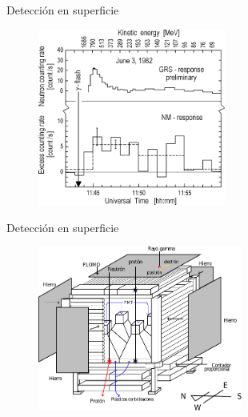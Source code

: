 \documentclass[spanish,aspectratio=169]{beamer}
\begin{document}
\begin{frame}{Detección en superficie}

\begin{figure}
	\centering
	\includegraphics[width=0.55\textwidth]{neutrons-ground.png}
\end{figure}

\end{frame}

\begin{frame}{Detección en superficie}

\begin{figure}
	\centering
	\includegraphics[width=0.6\textwidth]{tns-mexico.pdf}
\end{figure}

\end{frame}
\end{document}
